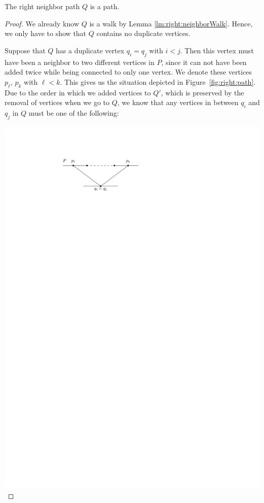     \begin{lemma}
      \label{lm:right:neighborPath}
      The right neighbor path $Q$ is a path.
    \end{lemma}
    \begin{proof}
      We already know $Q$ is a walk by Lemma \ref{lm:right:neighborWalk}. Hence, we only have to show that $Q$ contains no duplicate vertices.

      \vspace{2pt}
      \noindent
      \begin{minipage}[c]{0.5\linewidth}
      \setlength{\parindent}{15pt}
      Suppose that $Q$ has a duplicate vertex $q_i=q_j$ with $i<j$.
      Then this vertex must have been a neighbor to two different vertices in $P$, since it can not have been added twice while being connected to only one vertex.
      We denote these vertices $p_\ell$, $p_k$ with $\ell<k$.
      This gives us the situation depicted in Figure~\ref{fig:right:path}.
      Due to the order in which we added vertices to $Q'$, which is preserved by the removal of vertices when we go to $Q$, we know that any vertices in between $q_i$ and $q_j$ in $Q$ must be one of the following:
      \end{minipage}
      \hfill
      \begin{minipage}[c]{0.5\linewidth}
        \centering
        \includegraphics[scale=1]{unifiedAlgo/img/rightNeighbourwalk/neighborPathisPath.pdf}
        \label{fig:right:path}
      \end{minipage}


\end{proof}
